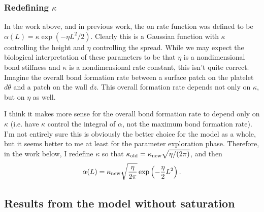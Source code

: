 \documentclass{article}
\newcommand{\tn}{\textnormal}
\begin{document}
\subsubsection{Redefining $\kappa$}
\label{sec:redefining-kappa}

In the work above, and in previous work, the on rate function was
defined to be $\alpha(L) = \kappa \exp(-\eta L^2/2)$. Clearly this is
a Gaussian function with $\kappa$ controlling the height and $\eta$
controlling the spread. While we may expect the biological
interpretation of these parameters to be that $\eta$ is a
nondimensional bond stiffness and $\kappa$ is a nondimensional rate
constant, this isn't quite correct. Imagine the overall bond formation
rate between a surface patch on the platelet $d\theta$ and a patch on
the wall $dz$. This overall formation rate depends not only on
$\kappa$, but on $\eta$ as well.

I think it makes more sense for the overall bond formation rate to
depend only on $\kappa$ (i.e. have $\kappa$ control the integral of
$\alpha$, not the maximum bond formation rate). I'm not entirely sure
this is obviously the better choice for the model as a whole, but it
seems better to me at least for the parameter exploration
phase. Therefore, in the work below, I redefine $\kappa$ so that
$\kappa_\tn{old} = \kappa_\tn{new} \sqrt{\eta/(2 \pi)}$, and then
\begin{equation}
  \alpha(L) = \kappa_\tn{new} \sqrt{\frac{\eta}{2\pi}}
  \exp\left(-\frac{\eta}{2}L^2\right).  
\end{equation}

\subsection{Results from the model without saturation}
\label{sec:results-from-model}
\end{document}
